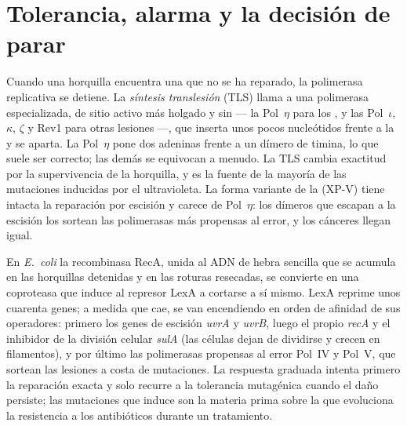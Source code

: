 \section{Tolerancia, alarma y la decisión de parar}

\begin{definition}\label{def:b3:dna-repair:tls}
Cuando una horquilla encuentra una  que no se ha reparado, la
polimerasa replicativa se detiene. La \emph{síntesis translesión} (TLS)
llama a una polimerasa especializada, de sitio activo más holgado y sin
 --- la Pol~$\eta$ para los , y
las Pol~$\iota$, $\kappa$, $\zeta$ y Rev1 para otras lesiones ---, que
inserta unos pocos nucleótidos frente a la  y se aparta. La
Pol~$\eta$ pone dos adeninas frente a un dímero de timina, lo que suele
ser correcto; las demás se equivocan a menudo. La TLS cambia exactitud
por la supervivencia de la horquilla, y es la fuente de la mayoría de las
mutaciones inducidas por el ultravioleta. La forma variante de la
 (XP-V) tiene intacta la reparación por escisión y
carece de Pol~$\eta$: los dímeros que escapan a la escisión los sortean
las polimerasas más propensas al error, y los cánceres llegan igual.
\end{definition}

\begin{proposition}\label{prop:b3:dna-repair:sos}
En \emph{E.~coli} la recombinasa RecA, unida al ADN de hebra sencilla que
se acumula en las horquillas detenidas y en las roturas resecadas, se
convierte en una coproteasa que induce al represor LexA a cortarse a sí
mismo. LexA reprime unos cuarenta genes; a medida que cae, se van
encendiendo en orden de afinidad de sus operadores: primero los genes de
escisión \emph{uvrA} y \emph{uvrB}, luego el propio \emph{recA} y el
inhibidor de la división celular \emph{sulA} (las células dejan de
dividirse y crecen en filamentos), y por último las polimerasas propensas
al error Pol~IV y Pol~V, que sortean las lesiones a costa de mutaciones.
La respuesta graduada intenta primero la reparación exacta y solo recurre
a la tolerancia mutagénica cuando el daño persiste; las mutaciones que
induce son la materia prima sobre la que evoluciona la resistencia a los
antibióticos durante un tratamiento.
\end{proposition}

